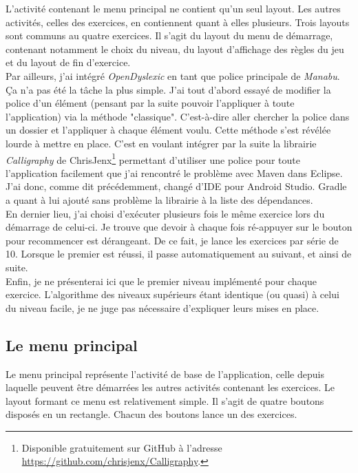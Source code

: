 L'activité contenant le menu principal ne contient qu'un seul layout. Les autres activités, celles des exercices, en contiennent quant à elles plusieurs. Trois layouts sont communs au quatre exercices. Il s'agit du layout du menu de démarrage, contenant notamment le choix du niveau, du layout d'affichage des règles du jeu et du layout de fin d'exercice.\\

Par ailleurs, j'ai intégré \textit{OpenDyslexic} en tant que police principale de \textit{Manabu}. Ça n'a pas été la tâche la plus simple. J'ai tout d'abord essayé de modifier la police d'un élément (pensant par la suite pouvoir l'appliquer à toute l'application) via la méthode "classique". C'est-à-dire aller chercher la police dans un dossier et l'appliquer à chaque élément voulu. Cette méthode s'est révélée lourde à mettre en place. C'est en voulant intégrer par la suite la librairie \textit{Calligraphy} de ChrisJenx\footnote{Disponible gratuitement sur GitHub à l'adresse \url{https://github.com/chrisjenx/Calligraphy}.} permettant d'utiliser une police pour toute l'application facilement que j'ai rencontré le problème avec Maven dans Eclipse. J'ai donc, comme dit précédemment, changé d'IDE pour Android Studio. Gradle a quant à lui ajouté sans problème la librairie à la liste des dépendances.\\

En dernier lieu, j'ai choisi d'exécuter plusieurs fois le même exercice lors du démarrage de celui-ci. Je trouve que devoir à chaque fois ré-appuyer sur le bouton pour recommencer est dérangeant. De ce fait, je lance les exercices par série de 10. Lorsque le premier est réussi, il passe automatiquement au suivant, et ainsi de suite.\\

Enfin, je ne présenterai ici que le premier niveau implémenté pour chaque exercice. L'algorithme des niveaux supérieurs étant identique (ou quasi) à celui du niveau facile, je ne juge pas nécessaire d'expliquer leurs mises en place.

\subsection{Le menu principal}
Le menu principal représente l'activité de base de l'application, celle depuis laquelle peuvent être démarrées les autres activités contenant les exercices. Le layout formant ce menu est relativement simple. Il s'agit de quatre boutons disposés en un rectangle. Chacun des boutons lance un des exercices.\\


